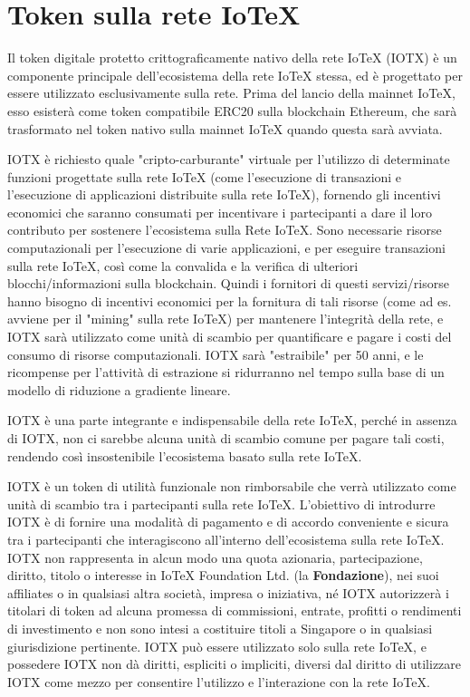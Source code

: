 \section{Token sulla rete IoTeX}
Il token digitale protetto crittograficamente nativo della rete IoTeX (IOTX) è un componente principale dell'ecosistema della rete IoTeX stessa, ed è progettato per essere utilizzato esclusivamente sulla rete. Prima del lancio della mainnet IoTeX, esso esisterà come token compatibile ERC20 sulla blockchain Ethereum, che sarà trasformato nel token nativo sulla mainnet IoTeX quando questa sarà avviata.

IOTX è richiesto quale "cripto-carburante" virtuale per l'utilizzo di determinate funzioni progettate sulla rete IoTeX (come l'esecuzione di transazioni e l'esecuzione di applicazioni distribuite sulla rete IoTeX), fornendo gli incentivi economici che saranno consumati per incentivare i partecipanti a dare il loro contributo per sostenere l'ecosistema sulla Rete IoTeX. Sono necessarie risorse computazionali per l'esecuzione di varie applicazioni, e per eseguire transazioni sulla rete IoTeX, così come la convalida e la verifica di ulteriori blocchi/informazioni sulla blockchain. Quindi i fornitori di questi servizi/risorse hanno bisogno di incentivi economici per la fornitura di tali risorse (come ad es. avviene per il "mining" sulla rete IoTeX) per mantenere l'integrità della rete, e IOTX sarà utilizzato come unità di scambio per quantificare e pagare i costi del consumo di risorse computazionali. IOTX sarà "estraibile" per 50 anni, e le ricompense per l'attività di estrazione si ridurranno nel tempo sulla base di un modello di riduzione a gradiente lineare.

IOTX è una parte integrante e indispensabile della rete IoTeX, perché in assenza di IOTX, non ci sarebbe alcuna unità di scambio comune per pagare tali costi, rendendo così insostenibile l'ecosistema basato sulla rete IoTeX.

IOTX è un token di utilità funzionale non rimborsabile che verrà utilizzato come unità di scambio tra i partecipanti sulla rete IoTeX. L'obiettivo di introdurre IOTX è di fornire una modalità di pagamento e di accordo conveniente e sicura tra i partecipanti che interagiscono all'interno dell'ecosistema sulla rete IoTeX. IOTX non rappresenta in alcun modo una quota azionaria, partecipazione, diritto, titolo o interesse in IoTeX Foundation Ltd. (la \textbf{Fondazione}), nei suoi affiliates o in qualsiasi altra società, impresa o iniziativa, né IOTX autorizzerà i titolari di token ad alcuna promessa di commissioni, entrate, profitti o rendimenti di investimento e non sono intesi a costituire titoli a Singapore o in qualsiasi giurisdizione pertinente. IOTX può essere utilizzato solo sulla rete IoTeX, e possedere IOTX non dà diritti, espliciti o impliciti, diversi dal diritto di utilizzare IOTX come mezzo per consentire l'utilizzo e l'interazione con la rete IoTeX.

